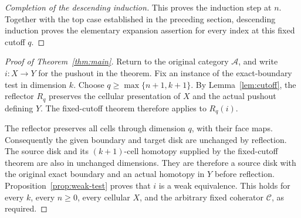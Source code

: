 \begin{proof}[Completion of the descending induction]
This proves the induction step at \(n\).  Together with the top
case established in the preceding section, descending induction proves
the elementary expansion assertion for every index at this fixed
cutoff \(q\).
\end{proof}

\begin{proof}[Proof of Theorem~\ref{thm:main}]
Return to the original category \(\mathcal A\), and write
\(i:X\to Y\) for the pushout in the theorem.  Fix an instance of
the exact-boundary test in dimension \(k\).  Choose
\(q\ge\max\{n+1,k+1\}\).  By Lemma~\ref{lem:cutoff}, the
reflector \(R_q\) preserves the cellular presentation of \(X\)
and the actual pushout defining \(Y\).  The fixed-cutoff theorem
therefore applies to \(R_q(i)\).

The reflector preserves all cells through dimension \(q\), with
their face maps.  Consequently the given boundary and target disk are
unchanged by reflection.  The source disk and its \((k+1)\)-cell
homotopy supplied by the fixed-cutoff theorem are also in unchanged
dimensions.  They are therefore a source disk with the original exact
boundary and an actual homotopy in \(Y\) before reflection.
Proposition~\ref{prop:weak-test} proves that \(i\) is a weak
equivalence.  This holds for every \(k\), every \(n\ge0\),
every cellular \(X\), and the arbitrary fixed coherator
\(\mathcal C\), as required.
\end{proof}
